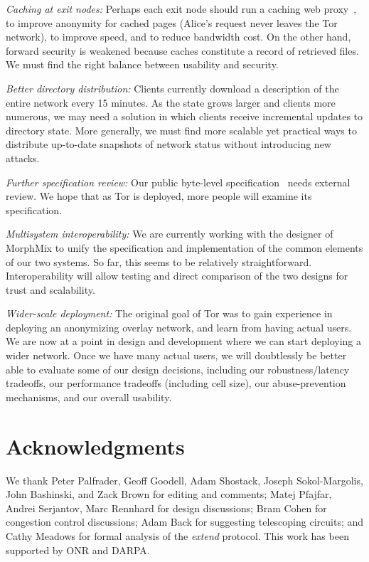 \documentclass[twocolumn]{article}
\begin{document}

\emph{Caching at exit nodes:} Perhaps each exit node should run a
caching web proxy~\cite{shsm03}, to improve anonymity for cached pages
(Alice's request never
leaves the Tor network), to improve speed, and to reduce bandwidth cost.
On the other hand, forward security is weakened because caches
constitute a record of retrieved files.  We must find the right
balance between usability and security.

\emph{Better directory distribution:}
Clients currently download a description of
the entire network every 15 minutes. As the state grows larger
and clients more numerous, we may need a solution in which
clients receive incremental updates to directory state.
More generally, we must find more
scalable yet practical ways to distribute up-to-date snapshots of
network status without introducing new attacks.

\emph{Further specification review:} Our public
byte-level specification~\cite{tor-spec} needs
external review.  We hope that as Tor
is deployed, more people will examine its
specification.

\emph{Multisystem interoperability:} We are currently working with the
designer of MorphMix to unify the specification and implementation of
the common elements of our two systems. So far, this seems
to be relatively straightforward.  Interoperability will allow testing
and direct comparison of the two designs for trust and scalability.

\emph{Wider-scale deployment:} The original goal of Tor was to
gain experience in deploying an anonymizing overlay network, and
learn from having actual users.  We are now at a point in design
and development where we can start deploying a wider network.  Once
we have many actual users, we will doubtlessly be better
able to evaluate some of our design decisions, including our
robustness/latency tradeoffs, our performance tradeoffs (including
cell size), our abuse-prevention mechanisms, and
our overall usability.


\section*{Acknowledgments}
 We thank Peter Palfrader, Geoff Goodell, Adam Shostack, Joseph Sokol-Margolis,
   John Bashinski, and Zack Brown
   for editing and comments;
 Matej Pfajfar, Andrei Serjantov, Marc Rennhard for design discussions;
 Bram Cohen for congestion control discussions;
 Adam Back for suggesting telescoping circuits; and
 Cathy Meadows for formal analysis of the \emph{extend} protocol.
 This work has been supported by ONR and DARPA.




\end{document}
